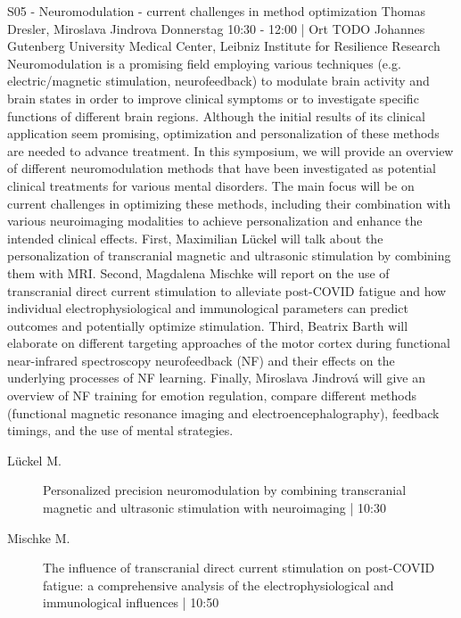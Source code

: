 
            \begin{symposium}
            {S05 - Neuromodulation - current challenges in method optimization}
            {Thomas Dresler, Miroslava Jindrova}
            {Donnerstag 10:30 - 12:00 | Ort TODO}
            {Johannes Gutenberg University Medical Center, Leibniz Institute for Resilience Research}
            Neuromodulation is a promising field employing various techniques (e.g. electric/magnetic stimulation, neurofeedback) to modulate brain activity and brain states in order to improve clinical symptoms or to investigate specific functions of different brain regions. Although the initial results of its clinical application seem promising, optimization and personalization of these methods are needed to advance treatment. In this symposium, we will provide an overview of different neuromodulation methods that have been investigated as potential clinical treatments for various mental disorders. The main focus will be on current challenges in optimizing these methods, including their combination with various neuroimaging modalities to achieve personalization and enhance the intended clinical effects. First, Maximilian Lückel will talk about the personalization of transcranial magnetic and ultrasonic stimulation by combining them with MRI. Second, Magdalena Mischke will report on the use of transcranial direct current stimulation to alleviate post-COVID fatigue and how individual electrophysiological and immunological parameters can predict outcomes and potentially optimize stimulation. Third, Beatrix Barth will elaborate on different targeting approaches of the motor cortex during functional near-infrared spectroscopy neurofeedback (NF) and their effects on the underlying processes of NF learning. Finally, Miroslava Jindrová will give an overview of NF training for emotion regulation, compare different methods (functional magnetic resonance imaging and electroencephalography), feedback timings, and the use of mental strategies.
            \begin{description}    
            
                \item [ Lückel M.] Personalized precision neuromodulation by combining transcranial magnetic and ultrasonic stimulation with neuroimaging \textcolor{mygray}{ | 10:30}    
                
                \item [ Mischke M.] The influence of transcranial direct current stimulation on post-COVID fatigue: a comprehensive analysis of the electrophysiological and immunological influences \textcolor{mygray}{ | 10:50}    
                

\end{description}
\end{symposium}
